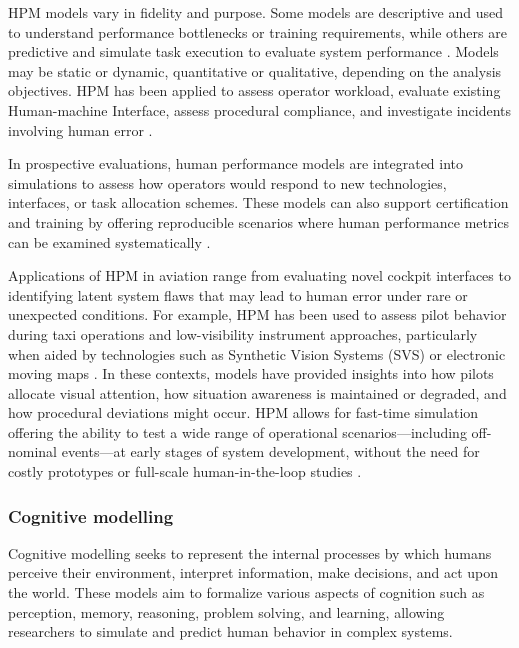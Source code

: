 \documentclass[12pt,a4paper]{article} %
\begin{document}
	HPM models vary in fidelity and purpose. Some models are descriptive and used to understand performance bottlenecks or training requirements, while others are predictive and simulate task execution to evaluate system performance \parencite{li_human_2020}. Models may be static or dynamic, quantitative or qualitative, depending on the analysis objectives. HPM has been applied to assess operator workload, evaluate existing Human-machine Interface, assess procedural compliance, and investigate incidents involving human error \parencite{zhang_pilot_2013,balaji_act-r_2023}.

	In prospective evaluations, human performance models are integrated into simulations to assess how operators would respond to new technologies, interfaces, or task allocation schemes. These models can also support certification and training by offering reproducible scenarios where human performance metrics can be examined systematically \parencite{wang_survey_2023,wu_pilot_2016}. 

	Applications of HPM in aviation range from evaluating novel cockpit interfaces to identifying latent system flaws that may lead to human error under rare or unexpected conditions. For example, HPM has been used to assess pilot behavior during taxi operations and low-visibility instrument approaches, particularly when aided by technologies such as Synthetic Vision Systems (SVS) or electronic moving maps \parencite{foyle_human_2005}. In these contexts, models have provided insights into how pilots allocate visual attention, how situation awareness is maintained or degraded, and how procedural deviations might occur. HPM allows for fast-time simulation offering the ability to test a wide range of operational scenarios—including off-nominal events—at early stages of system development, without the need for costly prototypes or full-scale human-in-the-loop studies \parencite{andrews_reshaping_2020}.


	\subsubsection{Cognitive modelling}
	Cognitive modelling seeks to represent the internal processes by which humans perceive their environment, interpret information, make decisions, and act upon the world. These models aim to formalize various aspects of cognition such as perception, memory, reasoning, problem solving, and learning, allowing researchers to simulate and predict human behavior in complex systems.
\end{document}

